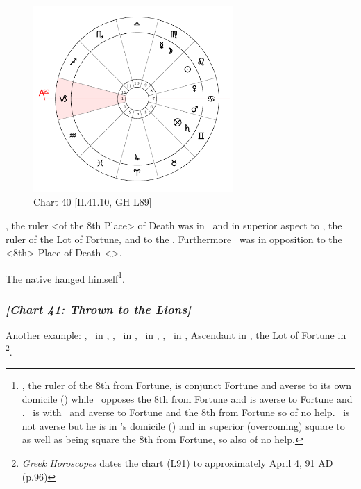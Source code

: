 \clearpage
\begin{figure}
\centering
\vspace{-20pt}
\includegraphics[width=0.68\textwidth]{charts/2_41_10}
\caption{Chart 40 [II.41.10, GH L89]}
\label{fig:chart40}
\end{figure} 

\noindent\Saturn, the ruler <of the 8th Place> of Death was in \Gemini\, and in superior aspect to \Mercury, the ruler of the Lot of Fortune, and to the \Moon. Furthermore \Mars\, was in opposition to the <8th> Place of Death <\Capricorn>. 

The native hanged himself\footnote{\Saturn, the ruler of the 8th from Fortune, is conjunct Fortune and averse to its own domicile (\Capricorn) while \Mars\, opposes the 8th from Fortune and is averse to Fortune and \Saturn. \Venus\, is with \Mars\, and averse to Fortune and the 8th from Fortune so of no help. \Jupiter\, is not averse but he is in \Mars's domicile (\Aries) and in superior (overcoming) square to \Mars\, as well as being square the 8th from Fortune, so also of no help.}.
\newpage
\subsubsection{\textit{[Chart 41: Thrown to the Lions]}}
Another example: \Sun, \Mercury\, in \Aries, \Moon, \Venus\, in \Pisces, \Saturn\, in \Cancer, \Jupiter, \Mars\, in \Taurus, Ascendant in \Scorpio, the Lot of Fortune in \Sagittarius
\footnote{\textit{Greek Horoscopes} dates the chart (L91) to approximately April 4, 91 AD (p.96)}. 

